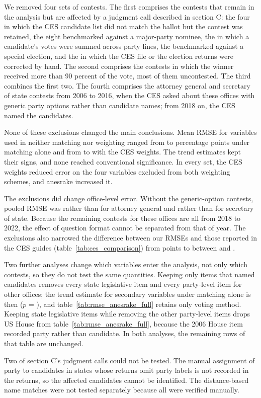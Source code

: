 \documentclass[12pt]{article}
\begin{document}
We removed four sets of contests. The first comprises the \SensNSectionC{} contests that remain in the analysis but are affected by a judgment call described in section C: the four in which the CES candidate list did not match the ballot but the contest was retained, the eight benchmarked against a major-party nominee, the \SensNFusion{} in which a candidate's votes were summed across party lines, the \SensNSpecial{} benchmarked against a special election, and the \SensNHandFix{} in which the CES file or the election returns were corrected by hand. The second comprises the \SensNGtNinety{} contests in which the winner received more than 90 percent of the vote, most of them uncontested. The third combines the first two. The fourth comprises the \SensNGenericAGSoS{} attorney general and secretary of state contests from 2006 to 2016, when the CES asked about these offices with generic party options rather than candidate names; from 2018 on, the CES named the candidates.

None of these exclusions changed the main conclusions. Mean RMSE for variables used in neither matching nor weighting ranged from \SensNeitherMatchMin{} to \SensNeitherMatchMax{} percentage points under matching alone and from \SensNeitherWtdMin{} to \SensNeitherWtdMax{} with the CES weights. The trend estimates kept their signs, and none reached conventional significance. In every set, the CES weights reduced error on the four variables excluded from both weighting schemes, and anesrake increased it.

The exclusions did change office-level error. Without the generic-option contests, pooled RMSE was \SensGenericAGRmse{} rather than \SensBaseAGRmse{} for attorney general and \SensGenericSoSRmse{} rather than \SensBaseSoSRmse{} for secretary of state. Because the remaining contests for these offices are all from 2018 to 2022, the effect of question format cannot be separated from that of year. The exclusions also narrowed the difference between our RMSEs and those reported in the CES guides (table~\ref{tab:ces_comparison}) from \GuideGapOverall{} points to between \SensGuideGapMin{} and \SensGuideGapMax{}.

Two further analyses change which variables enter the analysis, not only which contests, so they do not test the same quantities. Keeping only items that named candidates removes every state legislative item and every party-level item for other offices; the trend estimate for secondary variables under matching alone is then \SensNamedOnlyTrendBeta{} ($p$ = \SensNamedOnlyTrendP{}), and table~\ref{tab:rmse_anesrake_full} retains only voting method. Keeping state legislative items while removing the other party-level items drops US House from table~\ref{tab:rmse_anesrake_full}, because the 2006 House item recorded party rather than candidate. In both analyses, the remaining rows of that table are unchanged.

Two of section C's judgment calls could not be tested. The manual assignment of party to candidates in states whose returns omit party labels is not recorded in the returns, so the affected candidates cannot be identified. The distance-based name matches were not tested separately because all were verified manually.


\end{document}
